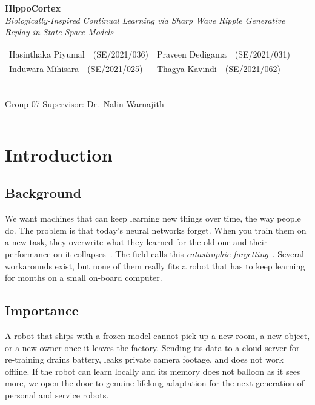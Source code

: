 \documentclass[11pt,a4paper]{article}
\renewcommand{\arraystretch}{1.0}
\begin{document}
\pagestyle{plain}

\begin{center}
{\sffamily\LARGE\bfseries HippoCortex}\\[0.2em]
{\itshape\small Biologically-Inspired Continual Learning via Sharp Wave Ripple Generative Replay in State Space Models}\\[0.7em]
{\footnotesize
\setlength{\tabcolsep}{4pt}\renewcommand{\arraystretch}{1.0}
\begin{tabular*}{0.82\linewidth}{@{\extracolsep{\fill}}ll@{}}
Hasinthaka Piyumal~~{\small(SE/2021/036)} & Praveen Dedigama~~{\small(SE/2021/031)} \\
Induwara Mihisara~~{\small(SE/2021/025)}  & Thagya Kavindi~~{\small(SE/2021/062)} \\
\end{tabular*}
}\\[0.5em]
{\footnotesize Group 07 \quad\textperiodcentered\quad Supervisor: Dr.~Nalin Warnajith}\\[0.4em]
{\color{rulegrey}\rule{\linewidth}{0.4pt}}
\end{center}

\section{Introduction}

\subsection{Background}
We want machines that can keep learning new things over time, the way people do. The problem is that today's neural networks forget. When you train them on a new task, they overwrite what they learned for the old one and their performance on it collapses~\citep{delange2022continual}. The field calls this \emph{catastrophic forgetting}~\citep{kirkpatrick2017overcoming}. Several workarounds exist, but none of them really fits a robot that has to keep learning for months on a small on-board computer.

\subsection{Importance}
A robot that ships with a frozen model cannot pick up a new room, a new object, or a new owner once it leaves the factory. Sending its data to a cloud server for re-training drains battery, leaks private camera footage, and does not work offline. If the robot can learn locally and its memory does not balloon as it sees more, we open the door to genuine lifelong adaptation for the next generation of personal and service robots.
\end{document}
